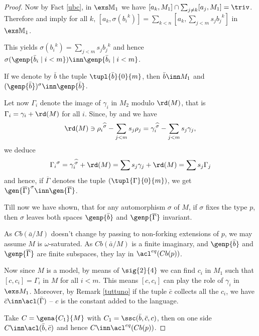 \begin{proof}
Now by Fact \ref{ubc},
in $\exs\mathbb{M}_{1}$ we have $[a_{k},{M}_{1}]\cap\sum_{j\neq k}[a_{j},{M}_{1}]=\triv$.
Therefore  and  imply for all $k$, $[a_{k},\sigma({b_{i}}^{k})]=
\sum_{k<n}[a_{k},\sum_{j<m}s_{j}{b_{j}}^{k}]$
in $\exs\mathbb{M}_{1}$.

This yields $\sigma({b_{i}}^{k})=\sum_{j<m}s_{j}{b_{j}}^{k}$ and hence
$\sigma(\genp{\bar b_{i}\mid i<m})\inn\genp{\bar b_{i}\mid i<m}$.

If we denote by $\bar b$ the tuple $\tupl{\bar b}{0}{m}$,
then $\bar b\inn M_{1}$ and $(\genp{\bar b})^{\sigma}\inn\genp{\bar b}$.

\medskip
Let now $\Gamma_{i}$ denote the image of $\gamma_{i}$ in $M_{2}$ modulo $\rd(M)$, that is
$\Gamma_{i}=\gamma_{i}+\rd(M)$ for all $i$. Since, by  and  we have
$$
\rd(M)\ni{\rho_{i}}^{\widehat\sigma}-\sum_{j<m} s_{j}\rho_{j}=\gamma_{i}^{\,\widehat\sigma}-\sum_{j<m}s_{j}\gamma_{j},$$
we deduce
$${\Gamma_{i}}^{\sigma}=\gamma_{i}^{\,\widehat\sigma}+\rd(M)=\sum s_{j}\gamma_{j}
+\rd(M)=\sum s_{j}\Gamma_{j}$$
and hence, if $\overline{\Gamma}$ denotes the tuple $(\tupl{\Gamma}{0}{m})$,
we get $\gen{\overline{\Gamma}}^{\sigma}\inn\gen{\overline{\Gamma}}$.

\smallskip
Till now we have shown, that for any automorphism $\sigma$ of $M$,
if $\sigma$ fixes the type $p$, then $\sigma$ leaves both spaces $\genp{\bar b}$ and $\genp{\overline{\Gamma}}$
invariant.

As $Cb(\bar a/M)$ doesn't change by passing to non-forking extensions of $p$,
we may assume $M$ is $\omega$-saturated. As $Cb(\bar a/M)$ is a finite imaginary,
and $\genp{\bar b}$ and $\genp{\overline{\Gamma}}$ are finite subspaces, they lay in $\acl^{eq}(Cb(p))$.

\medskip
Now since $M$ is a model, by means of $\sig{2}{4}$ we can find $c_{i}$ in $M_{1}$ such that
$[c,c_{i}]=\Gamma_{i}$ in $M$ for all $i<m$. This means $[c,c_{i}]$ can play the role of $\gamma_{i}$ in $\exs M_{1}$.
Moreover, by Remark \ref{tuttuno} if the tuple $\bar c$ collects all the $c_{i}$, %
we have $\bar c\inn\acl(\bar\Gamma)$ -- $c$ is the constant added to the language.

Take $C=\gena{C_{1}}{M}$ with $C_{1}=\ssc(\bar b,\bar c,c)$,
then on one side $C\inn\acl(\bar b,\bar c)$ and hence $C\inn\acl^{eq}(Cb(p))$.


\end{proof}
